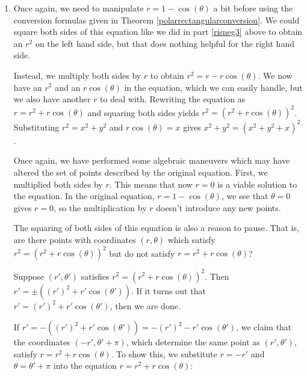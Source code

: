 \documentclass{ximera}
\begin{document}
\begin{example}
\begin{enumerate}
\begin{enumerate}
\item  Once again, we need to manipulate   $r = 1 - \cos(\theta)$ a bit before using the conversion formulas given in Theorem \ref{polarrectangularconversion}.  We could square both sides of this equation like we did in part \ref{risneg3} above to obtain an $r^2$ on the left hand side, but that does nothing helpful for the right hand side.  

\smallskip

Instead, we multiply both sides by $r$ to obtain  $r^{2} = r - r\cos(\theta)$.  We now have an $r^2$ and an $r\cos(\theta)$ in the equation, which we can easily handle, but we also have another $r$ to deal with.  Rewriting the equation as $r = r^{2} + r\cos(\theta)$ and squaring both sides yields $r^2 = \left(r^2 + r\cos(\theta)\right)^2$.  Substituting $r^2 = x^2 + y^2$ and $r\cos(\theta) = x$ gives   $x^2 + y^2 = \left(x^2 + y^2 + x\right)^2$.  

\smallskip

Once again, we have performed some algebraic maneuvers which may have altered the set of points described by the original equation.  First, we multiplied both sides by $r$.  This means that now $r=0$ is a viable solution to the equation.  In the original equation, $r = 1 - \cos(\theta)$, we see that $\theta = 0$ gives $r=0$, so the multiplication by $r$ doesn't introduce any new points. 

\smallskip

The squaring of both sides of this equation is also a reason to pause.  That is, are there points with coordinates $(r,\theta)$ which satisfy $r^2 = \left(r^2 + r\cos(\theta)\right)^2$ but do not satisfy $r = r^2 + r\cos(\theta)$?  

\smallskip

Suppose $\left(r',\theta'\right)$ satisfies $r^2 = \left(r^2 + r\cos(\theta)\right)^2$.  Then $r' = \pm \left((r')^2 + r'\cos(\theta')\right)$.  If it turns out that $r' = (r')^2 + r'\cos(\theta')$, then we are done.  

\smallskip

If  $r' = -\left((r')^2 + r'\cos(\theta')\right) = -(r')^{2} - r'\cos(\theta')$, we claim that the coordinates $(-r', \theta' + \pi)$, which determine the same point as $(r',\theta')$, satisfy $r = r^2 + r\cos(\theta)$.  To show this, we substitute $r =  -r'$ and $\theta = \theta' + \pi$ into the equation $r = r^2 + r\cos(\theta)$:

\[ \begin{array}{rclr}


\end{array}\]
\end{enumerate}
\end{enumerate}
\end{example}
\end{document}

